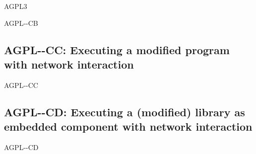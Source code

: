 \begin{license}{AGPL3}
\begin{lsuc}{AGPL-\ver-CB}
  \begin{lsucprohibits}
    \lsucitem{\noPatentLitigation}
  \end{lsucprohibits}
\end{lsuc}


\subsection{AGPL-\ver-CC: Executing a modified program with network interaction}
\begin{lsuc}{AGPL-\ver-CC}
  \label{OSUC-03N-AGPL}
  
  \useCaseC

  \begin{lsucrequires}
    \lsucmandatory{\keepLicenseElements}
    \lsucmandatory{\gplthreeEnsureCopyrightNoticeBinary}
    \lsucmandatory{\giveLicense}\passingFilesCorrectly
    \lsucmandatory{\retainCopyrightNotices}
    \lsucmandatory{\markProgramModifications}
    \lsucmandatory{\addToCopyrightDialogApp}
    \lsucmandatory{\arrangeProgramChanges}\howToApplyTheseTerms
    \lsucmandatory{\makeExecModifiedSourceAvailable}
    \lsucmandatory{\describeHowToGetSource}
    \lsucoptional{\createChangelog}
    \lsucoptional{\addToDocumentation}
  \end{lsucrequires}

  \begin{lsucprohibits}
    \lsucitem{\noPatentLitigation}
  \end{lsucprohibits}
\end{lsuc}

\subsection{AGPL-\ver-CD: Executing a (modified) library as embedded component
with network interaction}
\begin{lsuc}{AGPL-\ver-CD}

  \label{OSUC-06N-AGPL}
  \label{OSUC-09N-AGPL}
  
  
  \useCaseD

  \begin{lsucrequires}
    \lsucmandatory{\keepLicenseElements}
    \lsucmandatory{\gplthreeEnsureCopyrightNoticeBinary}
    \lsucmandatory{\giveLicense}\passingFilesCorrectly
    \lsucmandatory{\retainCopyrightNotices}
    \lsucmandatory{\makeExecAllSourcesAvailable}
    \lsucmandatory{\describeHowToGetSource}
    \lsucmandatory{\addToCopyrightDialogLib}
    \lsucmandatory{\markEmbeddedModifications}
    \lsucmandatory{\arrangeEmbeddedChanges}\howToApplyTheseTerms
    \lsucmandatory{\arrangeEnclosingBinaries}
    \lsucoptional{\createChangelog}
    \lsucoptional{\addToDocumentation}
  \end{lsucrequires}


\end{lsuc}
\end{license}
